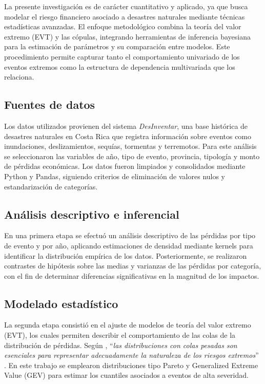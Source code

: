 \documentclass[12pt, a4paper]{article}
\begin{document}
La presente investigación es de carácter cuantitativo y aplicado, ya que busca modelar el riesgo financiero asociado a desastres naturales mediante técnicas estadísticas avanzadas. El enfoque metodológico combina la teoría del valor extremo (EVT) y las cópulas, integrando herramientas de inferencia bayesiana para la estimación de parámetros y su comparación entre modelos. Este procedimiento permite capturar tanto el comportamiento univariado de los eventos extremos como la estructura de dependencia multivariada que los relaciona.

\subsection*{Fuentes de datos}
Los datos utilizados provienen del sistema \textit{DesInventar}, una base histórica de desastres naturales en Costa Rica que registra información sobre eventos como inundaciones, deslizamientos, sequías, tormentas y terremotos. Para este análisis se seleccionaron las variables de año, tipo de evento, provincia, tipología y monto de pérdidas económicas. Los datos fueron limpiados y consolidados mediante Python y Pandas, siguiendo criterios de eliminación de valores nulos y estandarización de categorías.

\subsection*{Análisis descriptivo e inferencial}
En una primera etapa se efectuó un análisis descriptivo de las pérdidas por tipo de evento y por año, aplicando estimaciones de densidad mediante kernels para identificar la distribución empírica de los datos. Posteriormente, se realizaron contrastes de hipótesis sobre las medias y varianzas de las pérdidas por categoría, con el fin de determinar diferencias significativas en la magnitud de los impactos. 

\subsection*{Modelado estadístico}
La segunda etapa consistió en el ajuste de modelos de teoría del valor extremo (EVT), los cuales permiten describir el comportamiento de las colas de la distribución de pérdidas. Según , “\textit{las distribuciones con colas pesadas son esenciales para representar adecuadamente la naturaleza de los riesgos extremos}” \cite[p. 260]{Klugman2019}. En este trabajo se emplearon distribuciones tipo Pareto y Generalized Extreme Value (GEV) para estimar los cuantiles asociados a eventos de alta severidad.
\end{document}

